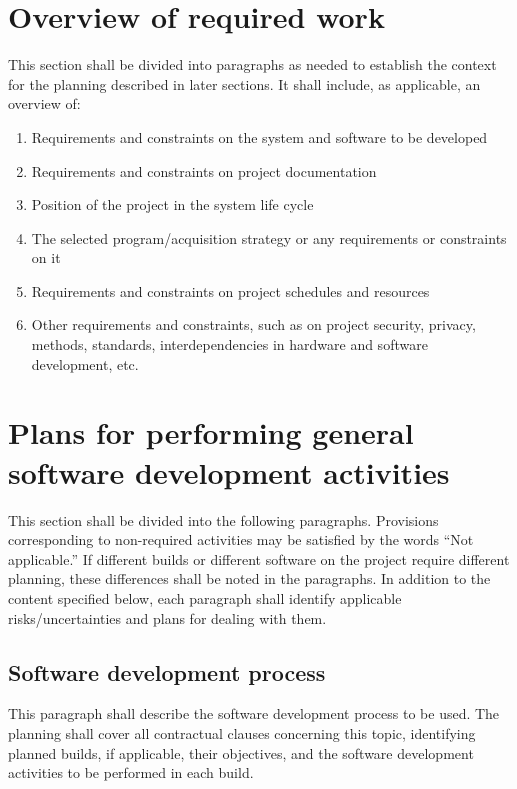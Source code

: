\section{Overview of required work}

This section shall be divided into paragraphs as needed to establish the
context for the planning described in later sections. It shall include,
as applicable, an overview of:

\begin{enumerate}
\itemsep1pt\parskip0pt
\item
  Requirements and constraints on the system and software to be
  developed
\item
  Requirements and constraints on project documentation
\item
  Position of the project in the system life cycle
\item
  The selected program/acquisition strategy or any requirements or
  constraints on it
\item
  Requirements and constraints on project schedules and resources
\item
  Other requirements and constraints, such as on project security,
  privacy, methods, standards, interdependencies in hardware and
  software development, etc.
\end{enumerate}

\section{Plans for performing general software development
activities}

This section shall be divided into the following paragraphs. Provisions
corresponding to non-required activities may be satisfied by the words
``Not applicable.'' If different builds or different software on the
project require different planning, these differences shall be noted in
the paragraphs. In addition to the content specified below, each
paragraph shall identify applicable risks/uncertainties and plans for
dealing with them.

\subsection{Software development process}

This paragraph shall describe the software development process to be
used. The planning shall cover all contractual clauses concerning this
topic, identifying planned builds, if applicable, their objectives, and
the software development activities to be performed in each build.

